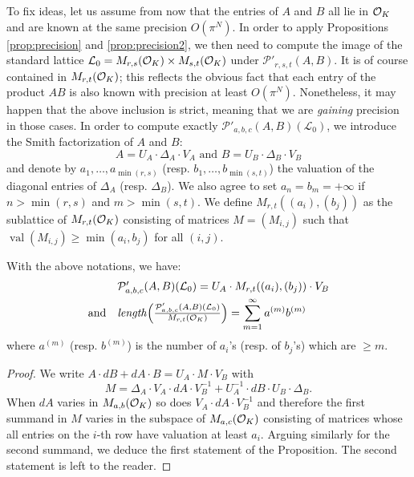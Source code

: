 \documentclass{sig-alternate}
\DeclareMathOperator{\val}{val}
\begin{document}
To fix ideas, let us assume from now that the entries of $A$ and $B$ all 
lie in $\mathcal O_K$ and are known at the same precision $O(\pi^N)$. In order 
to apply Propositions \ref{prop:precision} and \ref{prop:precision2}, we then need to compute the image 
of the standard lattice $\mathcal L_0 = M_{r,s}(\mathcal O_K) \times 
M_{s,t}(\mathcal O_K)$ under $\mathcal P'_{r,s,t}(A,B)$. It is of course 
contained in $M_{r,t}(\mathcal O_K)$; this reflects the obvious fact that each 
entry of the product $AB$ is also known with precision at least $O(\pi^N)$. 
Nonetheless, it may happen that the above inclusion is strict, meaning 
that we are \emph{gaining} precision in those cases. In order to compute 
exactly $\mathcal P'_{a,b,c}(A,B)(\mathcal L_0)$, we introduce the Smith 
factorization of $A$ and $B$:
$$A = U_A \cdot \Delta_A \cdot V_A
\text{ and } B = U_B \cdot \Delta_B \cdot V_B$$
and denote by $a_1, \ldots, a_{\min(r,s)}$ (resp. $b_1, \ldots, 
b_{\min(s,t)}$) the valuation of the diagonal entries of $\Delta_A$
(resp. $\Delta_B$). We also agree to set $a_n = b_m = +\infty$ if
$n > \min(r,s)$ and $m > \min(s,t)$. We define $M_{r,t}((a_i),(b_j))$ 
as the sublattice of $M_{r,t}(\mathcal O_K)$ consisting of matrices $M = (M_{i,j})$ 
such that $\val(M_{i,j}) \geq \min(a_i,b_j)$ for all $(i,j)$.

\begin{prop}
\label{prop:mulmatrix}
With the above notations, we have:
$$\begin{array}{rl}
& \mathcal P'_{a,b,c}(A,B)(\mathcal L_0)
= U_A \cdot M_{r,t}((a_i),(b_j)) \cdot V_B \smallskip \\
\text{and} &
\text{\emph{length}}\Big(\frac{\mathcal P'_{a,b,c}(A,B)(\mathcal L_0) }
{M_{r,t}(\O_K)}\Big) =
\displaystyle 
\sum_{m=1}^\infty a^{(m)} b^{(m)}
\end{array}$$
where $a^{(m)}$ (resp. $b^{(m)}$) is the number of $a_i$'s (resp.
of $b_j$'s) which are $\geq m$.
\end{prop}

\begin{proof}
We write $A \cdot dB + dA \cdot B = U_A \cdot M \cdot V_B$ with
$$M = \Delta_A \cdot V_A \cdot dA \cdot V_B^{-1} 
+ U_A^{-1} \cdot dB \cdot U_B \cdot \Delta_B.$$
When $dA$ varies in $M_{a,b}(\mathcal O_K)$ so does $V_A \cdot dA \cdot V_B^{-1}$
and therefore the first summand in $M$ varies in the subspace of 
$M_{a,c}(\mathcal O_K)$ consisting of matrices whose all entries on the $i$-th
row have valuation at least $a_i$. Arguing similarly for the second
summand, we deduce the first statement of the Proposition. The second
statement is left to the reader.
\end{proof}
\end{document}
